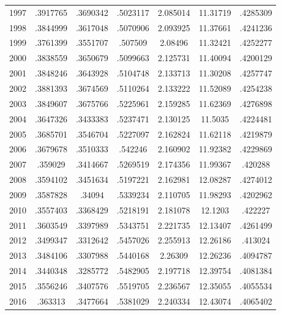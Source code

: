 {\begin{longtable}{l*{1}{cccccc}}
1997        &    .3917765&    .3690342&    .5023117&    2.085014&    11.31719&    .4285309\\
1998        &    .3844999&    .3617048&    .5070906&    2.093925&    11.37661&    .4241236\\
1999        &    .3761399&    .3551707&     .507509&     2.08496&    11.32421&    .4252277\\
2000        &    .3838559&    .3650679&    .5099663&    2.125731&    11.40094&    .4200129\\
2001        &    .3848246&    .3643928&    .5104748&    2.133713&    11.30208&    .4257747\\
2002        &    .3881393&    .3674569&    .5110264&    2.133222&    11.52089&    .4254238\\
2003        &    .3849607&    .3675766&    .5225961&    2.159285&    11.62369&    .4276898\\
2004        &    .3647326&    .3433383&    .5237471&    2.130125&     11.5035&    .4224481\\
2005        &    .3685701&    .3546704&    .5227097&    2.162824&    11.62118&    .4219879\\
2006        &    .3679678&    .3510333&     .542246&    2.160902&    11.92382&    .4229869\\
2007        &     .359029&    .3414667&    .5269519&    2.174356&    11.99367&     .420288\\
2008        &    .3594102&    .3451634&    .5197221&    2.162981&    12.08287&    .4274012\\
2009        &    .3587828&      .34094&    .5339234&    2.110705&    11.98293&    .4202962\\
2010        &    .3557403&    .3368429&    .5218191&    2.181078&     12.1203&     .422227\\
2011        &    .3603549&    .3397989&    .5343751&    2.221735&    12.13407&    .4261499\\
2012        &    .3499347&    .3312642&    .5457026&    2.255913&    12.26186&     .413024\\
2013        &    .3484106&    .3307988&    .5440168&     2.26309&    12.26236&    .4094787\\
2014        &    .3440348&    .3285772&    .5482905&    2.197718&    12.39754&    .4081384\\
2015        &    .3556246&    .3407576&    .5519705&    2.236567&    12.35055&    .4055534\\
2016        &     .363313&    .3477664&    .5381029&    2.240334&    12.43074&    .4065402\\

\end{longtable}}

